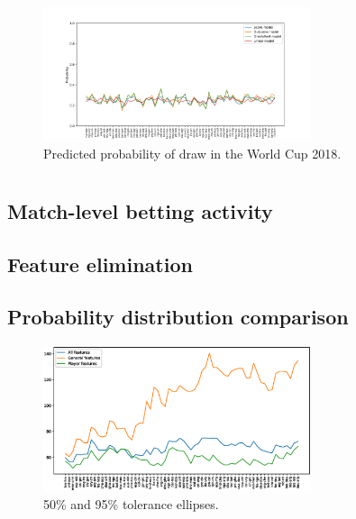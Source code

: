 \begin{figure}[H]
    \centering
    \includegraphics[width=0.7\textwidth]{img/match_level_2018_model_probability_draw_prob.png}
    \caption{Predicted probability of draw in the World Cup 2018.}
    \label{fig:draw_probability}
\end{figure}


\section{}
\subsection{Match-level betting activity}
\subsection{Feature elimination}
\subsection{Probability distribution comparison}



\begin{figure}[H]
    \centering
    \includegraphics[width=0.7\textwidth]{img/match_level_score_2014_kelly.eps}
    \caption{50\% and 95\% tolerance ellipses.}
    \label{fig:50_95}
\end{figure}